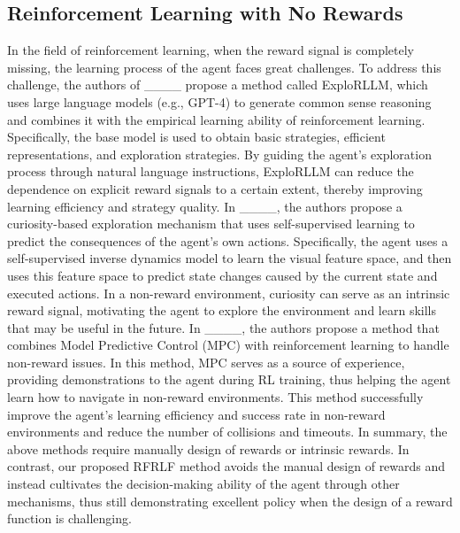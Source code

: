 \subsection{Reinforcement Learning with No Rewards}
In the field of reinforcement learning, when the reward signal is completely missing, the learning process of the agent faces great challenges. To address this challenge, the authors of ____ propose a method called ExploRLLM, which uses large language models (e.g., GPT-4) to generate common sense reasoning and combines it with the empirical learning ability of reinforcement learning. Specifically, the base model is used to obtain basic strategies, efficient representations, and exploration strategies. By guiding the agent's exploration process through natural language instructions, ExploRLLM can reduce the dependence on explicit reward signals to a certain extent, thereby improving learning efficiency and strategy quality. In ____, the authors propose a curiosity-based exploration mechanism that uses self-supervised learning to predict the consequences of the agent's own actions. Specifically, the agent uses a self-supervised inverse dynamics model to learn the visual feature space, and then uses this feature space to predict state changes caused by the current state and executed actions. In a non-reward environment, curiosity can serve as an intrinsic reward signal, motivating the agent to explore the environment and learn skills that may be useful in the future. In ____, the authors propose a method that combines Model Predictive Control (MPC) with reinforcement learning to handle non-reward issues. In this method, MPC serves as a source of experience, providing demonstrations to the agent during RL training, thus helping the agent learn how to navigate in non-reward environments. This method successfully improve the agent's learning efficiency and success rate in non-reward environments and reduce the number of collisions and timeouts. In summary, the above methods require manually design of rewards or intrinsic rewards. In contrast, our proposed RFRLF method avoids the manual design of rewards and instead cultivates the decision-making ability of the agent through other mechanisms, thus still demonstrating excellent policy when the design of a reward function is challenging.

